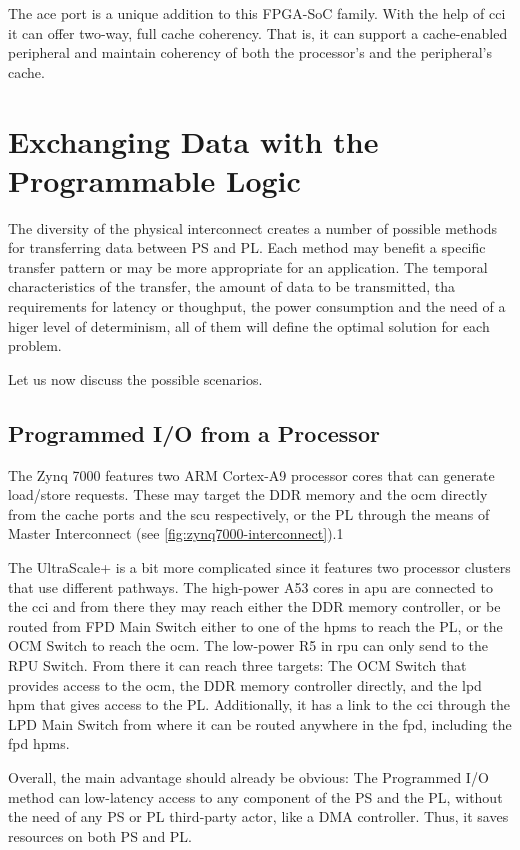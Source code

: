 The \gls{ace} port is a unique addition to this FPGA-SoC family. 
With the help of \gls{cci} it can offer two-way, full cache coherency.
That is, it can support a cache-enabled peripheral and maintain coherency of both
the processor's and the peripheral's cache.

\section{Exchanging Data with the Programmable Logic}

The diversity of the physical interconnect creates a number of 
possible methods for transferring data between PS and PL.
Each method may benefit a specific transfer pattern
or may be more appropriate for an application.
The temporal characteristics of the transfer,
the amount of data to be transmitted, 
tha requirements for latency or thoughput,
the power consumption and the need of a higer level of determinism,
all of them will define the optimal solution for each problem.

Let us now discuss the possible scenarios.

\subsection{Programmed I/O from a Processor}

The Zynq 7000 features two ARM Cortex-A9 processor cores
that can generate load/store requests. These may target
the DDR memory and the \gls{ocm} directly from the cache ports
and the \gls{scu} respectively, or the PL through the means
of Master Interconnect (see \ref{fig:zynq7000-interconnect}).1

The UltraScale+ is a bit more complicated since it features
two processor clusters that use different pathways.
The high-power A53 cores in \gls{apu} are connected to the \gls{cci}
and from there they may reach either the DDR memory controller,
or be routed from FPD Main Switch either to one of the \acrlong{hpm}s to reach the PL,
or the OCM Switch to reach the \gls{ocm}.
The low-power R5 in \gls{rpu} can only send to the RPU Switch.
From there it can reach three targets: 
The OCM Switch that provides access to the \gls{ocm},
the DDR memory controller directly,
and the \gls{lpd} \gls{hpm} that gives access to the PL.
Additionally, it has a link to the \gls{cci} through the LPD Main Switch
from where it can be routed anywhere in the \acrlong{fpd}, including the \gls{fpd} \glspl{hpm}.

Overall, the main advantage should already be obvious:
The Programmed I/O method can low-latency access to any component of the PS and the PL,
without the need of any PS or PL third-party actor, like a DMA controller. Thus, it saves
resources on both PS and PL.

